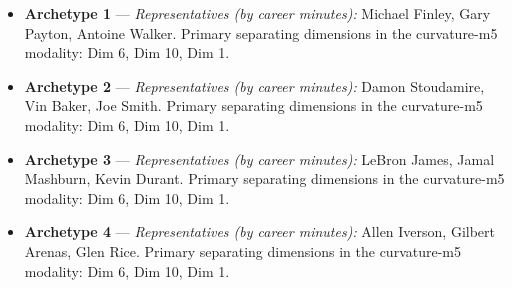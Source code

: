 \begin{itemize}
\item \textbf{Archetype 1} --- \emph{Representatives (by career minutes):} Michael Finley, Gary Payton, Antoine Walker. Primary separating dimensions in the curvature-m5 modality: Dim 6, Dim 10, Dim 1.
\item \textbf{Archetype 2} --- \emph{Representatives (by career minutes):} Damon Stoudamire, Vin Baker, Joe Smith. Primary separating dimensions in the curvature-m5 modality: Dim 6, Dim 10, Dim 1.
\item \textbf{Archetype 3} --- \emph{Representatives (by career minutes):} LeBron James, Jamal Mashburn, Kevin Durant. Primary separating dimensions in the curvature-m5 modality: Dim 6, Dim 10, Dim 1.
\item \textbf{Archetype 4} --- \emph{Representatives (by career minutes):} Allen Iverson, Gilbert Arenas, Glen Rice. Primary separating dimensions in the curvature-m5 modality: Dim 6, Dim 10, Dim 1.
\end{itemize}
